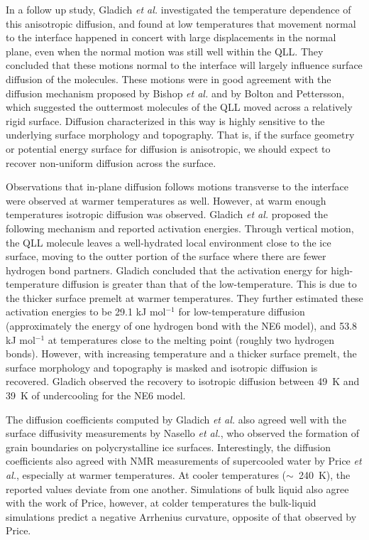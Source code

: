 In a follow up study, Gladich \textit{et al.} investigated the
temperature dependence of this anisotropic diffusion, and found at low
temperatures that movement normal to the interface happened in concert
with large displacements in the normal plane, even when the normal
motion was still well within the QLL.\cite{Gladich2011} They concluded
that these motions normal to the interface will largely influence
surface diffusion of the molecules. These motions were in good
agreement with the diffusion mechanism proposed by Bishop \textit{et
  al.}\cite{Bishop2009} and by Bolton and Pettersson\cite{Bolton2000},
which suggested the outtermost molecules of the QLL moved across a
relatively rigid surface. Diffusion characterized in this way is
highly sensitive to the underlying surface morphology and topography.
That is, if the surface geometry or potential energy surface for
diffusion is anisotropic, we should expect to recover non-uniform
diffusion across the surface.

Observations that in-plane diffusion follows motions transverse to the
interface were observed at warmer temperatures as well. However, at
warm enough temperatures isotropic diffusion was
observed.\cite{Gladich2011,Gladich2015} Gladich \textit{et al.}
proposed the following mechanism and reported activation
energies. Through vertical motion, the QLL molecule leaves a
well-hydrated local environment close to the ice surface, moving to
the outter portion of the surface where there are fewer hydrogen bond
partners. Gladich concluded that the activation energy for
high-temperature diffusion is greater than that of the
low-temperature. This is due to the thicker surface premelt at warmer
temperatures.  They further estimated these activation energies to be
29.1 kJ mol$^{-1}$ for low-temperature diffusion (approximately the
energy of one hydrogen bond with the NE6 model), and 53.8 kJ
mol$^{-1}$ at temperatures close to the melting point (roughly two
hydrogen bonds).  However, with increasing temperature and a thicker
surface premelt, the surface morphology and topography is masked and
isotropic diffusion is recovered. Gladich observed the recovery to
isotropic diffusion between 49~K and 39~K of undercooling for the NE6
model.

The diffusion coefficients computed by Gladich \textit{et al.} also
agreed well with the surface diffusivity measurements by Nasello
\textit{et al.}, who observed the formation of grain boundaries on
polycrystalline ice surfaces.\cite{Nasello2007} Interestingly, the
diffusion coefficients also agreed with NMR measurements of
supercooled water by Price \textit{et al.}, especially at warmer
temperatures. \cite{Price1999} At cooler temperatures ($\sim$~240~K),
the reported values deviate from one another. Simulations of bulk
liquid also agree with the work of Price, however, at colder
temperatures the bulk-liquid simulations predict a negative Arrhenius
curvature, opposite of that observed by
Price.\cite{Picaud2006,Mahoney2001}

